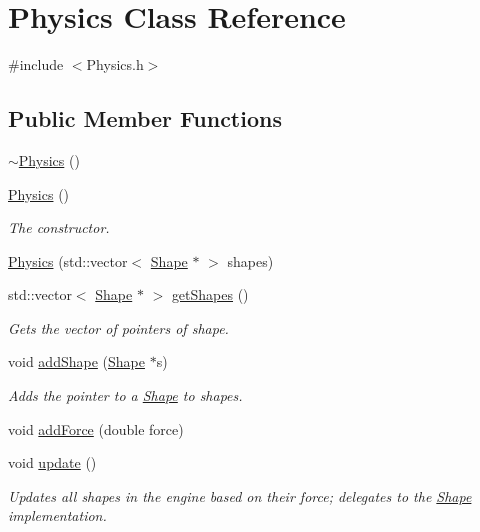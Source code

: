 \hypertarget{class_physics}{}\section{Physics Class Reference}
\label{class_physics}


{\ttfamily \#include $<$Physics.\+h$>$}

\subsection*{Public Member Functions}
\begin{DoxyCompactItemize}
\item 
\mbox{\hyperlink{class_physics_a045c3788e28059d3920136499942490f}{$\sim$\+Physics}} ()
\item 
\mbox{\hyperlink{class_physics_a4b2ebc0a344f04f48d227c72f0d0fbda}{Physics}} ()
\begin{DoxyCompactList}\small\item\em The constructor. \end{DoxyCompactList}\item 
\mbox{\hyperlink{class_physics_a06eee33fdf21652830746d0900d4b401}{Physics}} (std\+::vector$<$ \mbox{\hyperlink{class_shape}{Shape}} $\ast$ $>$ shapes)
\item 
std\+::vector$<$ \mbox{\hyperlink{class_shape}{Shape}} $\ast$ $>$ \mbox{\hyperlink{class_physics_aa65295ddbbb7cdf44fa6273c028e3cb6}{get\+Shapes}} ()
\begin{DoxyCompactList}\small\item\em Gets the vector of pointers of shape. \end{DoxyCompactList}\item 
void \mbox{\hyperlink{class_physics_acff9e03cc4cff17239a8fb25a6ecbd76}{add\+Shape}} (\mbox{\hyperlink{class_shape}{Shape}} $\ast$s)
\begin{DoxyCompactList}\small\item\em Adds the pointer to a \mbox{\hyperlink{class_shape}{Shape}} to shapes. \end{DoxyCompactList}\item 
void \mbox{\hyperlink{class_physics_aaa8c532b63deb718c73aa0f3aaadccb4}{add\+Force}} (double force)
\item 
void \mbox{\hyperlink{class_physics_a309579d8a466dbcc36c6b4db136b1e9b}{update}} ()
\begin{DoxyCompactList}\small\item\em Updates all shapes in the engine based on their force; delegates to the \mbox{\hyperlink{class_shape}{Shape}} implementation. \end{DoxyCompactList}\end{DoxyCompactItemize}



